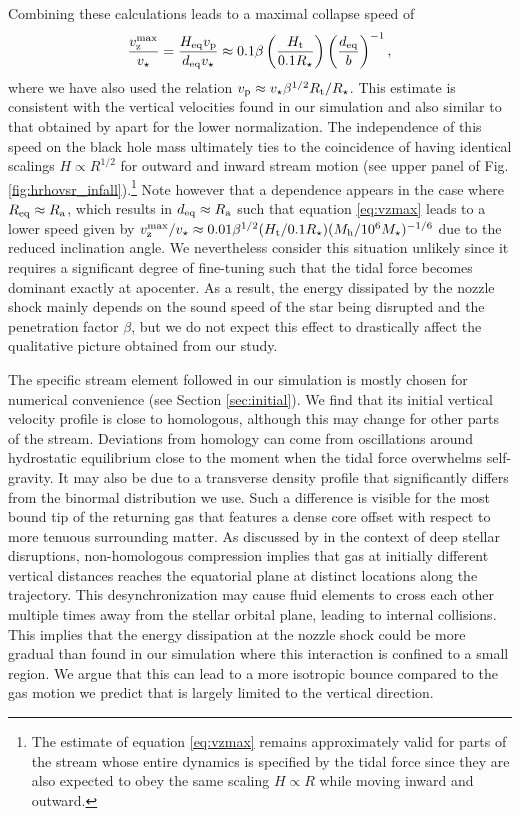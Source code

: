 \documentclass[a4paper,fleqn,usenatbib]{mnras}
\newcommand{\be}{\begin{equation}}
\newcommand{\ee}{\end{equation}}
\newcommand{\mstar}{M_{\star}}
\newcommand{\rstar}{R_{\star}}
\newcommand{\rt}{R_{\rm t}}
\newcommand{\mh}{M_{\rm h}}
\begin{document}
Combining these calculations leads to a maximal collapse speed of
\be
\frac{v^{\rm max}_{\rm z}}{v_{\star}} = \frac{H_{\rm eq} v_{\rm p}}{d_{\rm eq} v_{\star}} \approx 0.1  \beta \left(\frac{H_{\rm t}}{0.1 \rstar}\right) \left(\frac{d_{\rm eq}}{b}\right)^{-1},
\label{eq:vzmax}
\ee
where we have also used the relation $v_{\rm p} \approx v_{\star} \beta^{1/2} \rt  / \rstar$. This estimate is consistent with the vertical velocities found in our simulation and also similar to that obtained by \citet{guillochon2014-10jh} apart for the lower normalization. The independence of this speed on the black hole mass ultimately ties to the coincidence of having identical scalings $H \propto R^{1/2}$ for outward and inward stream motion (see upper panel of Fig. \ref{fig:hrhovsr_infall}).\footnote{The estimate of equation \eqref{eq:vzmax} remains approximately valid for parts of the stream whose entire dynamics is specified by the tidal force since they are also expected to obey the same scaling $H \propto R$ \citep{coughlin2016-structure} while moving inward and outward.} Note however that a dependence appears in the case where $R_{\rm eq} \approx  R_{\rm a}$, which results in $d_{\rm eq} \approx  R_{\rm a}$ such that equation \eqref{eq:vzmax} leads to a lower speed given by $v^{\rm max}_{\rm z}/v_{\star} \approx 0.01 \beta^{1/2} (H_{\rm t} / 0.1 \rstar) (\mh/10^6 \mstar)^{-1/6} $ due to the reduced inclination angle. We nevertheless consider this situation unlikely since it requires a significant degree of fine-tuning such that the tidal force becomes dominant exactly at apocenter. As a result, the energy dissipated by the nozzle shock mainly depends on the sound speed of the star being disrupted and the penetration factor $\beta$, but we do not expect this effect to drastically affect the qualitative picture obtained from our study.

The specific stream element followed in our simulation is mostly chosen for numerical convenience (see Section \ref{sec:initial}). We find that its initial vertical velocity profile is close to homologous, although this may change for other parts of the stream. Deviations from homology can come from oscillations around hydrostatic equilibrium close to the moment when the tidal force overwhelms self-gravity. It may also be due to a transverse density profile that significantly differs from the binormal distribution we use. Such a difference is visible for the most bound tip of the returning gas that features a dense core offset with respect to more tenuous surrounding matter. As discussed by \citet{stone2013} in the context of deep stellar disruptions, non-homologous compression implies that gas at initially different vertical distances reaches the equatorial plane  at distinct locations along the trajectory. This desynchronization may cause fluid elements to cross each other multiple times away from the stellar orbital plane, leading to internal collisions. This implies that the energy dissipation at the nozzle shock could be more gradual than found in our simulation where this interaction is confined to a small region. We argue that this can lead to a more isotropic bounce compared to the gas motion we predict that is largely limited to the vertical direction. 
\end{document}
